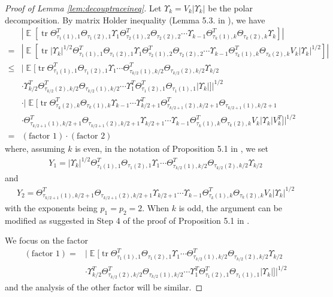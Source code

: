 \documentclass[11pt]{amsart}
\numberwithin{equation}{section}
\numberwithin{equation}{section}
\DeclareMathOperator{\E}{\mathbb{E}}
\DeclareMathOperator*{\tr}{tr}
\theoremstyle{remark}
\theoremstyle{definition}
\begin{document}
\begin{proof}[Proof of Lemma \ref{lem:decouptraceineq}]
Let $\Upsilon_k=V_k|\Upsilon_k|$ be the polar decomposition. By matrix Holder inequality (Lemma 5.3. in \cite{brailovskaya2022universality}), we have
\begin{align*}
    &|\E[
	\tr \Theta_{\tau_{1}(1),1}^T\Theta_{\tau_{1}(2),1}
	\Upsilon_1\Theta_{\tau_{2}(1),2}^T\Theta_{\tau_{2}(2),2}\cdots
	\Upsilon_{k-1}\Theta_{\tau_{k}(1),k}^T\Theta_{\tau_{k}(2),k}\Upsilon_k]|
 \\ = & |\E[
	\tr |\Upsilon_k|^{1/2}\Theta_{\tau_{1}(1),1}^T\Theta_{\tau_{1}(2),1}
	\Upsilon_1\Theta_{\tau_{2}(1),2}^T\Theta_{\tau_{2}(2),2}\cdots
	\Upsilon_{k-1}\Theta_{\tau_{k}(1),k}^T\Theta_{\tau_{k}(2),k}V_k|\Upsilon_k|^{1/2}]|
 \\ \le & |\E[
	\tr \Theta_{\tau_{1}(1),1}^T\Theta_{\tau_{1}(2),1}
	\Upsilon_1 \cdots \Theta_{\tau_{k/2}(1),k/2}^T\Theta_{\tau_{k/2}(2),k/2}
	\Upsilon_{k/2} 
 \\& \cdot \Upsilon_{k/2}^T \Theta_{\tau_{k/2}(2),k/2}^T\Theta_{\tau_{k/2}(1),k/2} \cdots \Upsilon_{1}^T \Theta_{\tau_{1}(2),1}^T\Theta_{\tau_{1}(1),1} |\Upsilon_k|]|^{1/2}
\\ &\cdot |\E[
	\tr  \Theta_{\tau_{k}(2),k}^T\Theta_{\tau_{k}(1),k}
	\Upsilon_{k-1} \cdots \Upsilon_{k/2+1}^T \Theta_{\tau_{k/2+1}(2),k/2+1}^T\Theta_{\tau_{k/2+1}(1),k/2+1}
 \\& \cdot
	\Theta_{\tau_{k/2+1}(1),k/2+1}^T\Theta_{\tau_{k/2+1}(2),k/2+1} \Upsilon_{k/2+1} \cdots \Upsilon_{k-1}  \Theta_{\tau_{k}(1),k}^T\Theta_{\tau_{k}(2),k} V_k |\Upsilon_k|V_k^T]|^{1/2}
  \\ =& (\text{factor 1}) \cdot (\text{factor 2})
\end{align*}
where, assuming $k$ is even, in the notation of Proposition 5.1 in \cite{brailovskaya2022universality}, we set
\begin{align*}Y_1=|\Upsilon_k|^{1/2}\Theta_{\tau_{1}(1),1}^T\Theta_{\tau_{1}(2),1}
	\Upsilon_1 \cdots \Theta_{\tau_{k/2}(1),k/2}^T\Theta_{\tau_{k/2}(2),k/2}
	\Upsilon_{k/2}\end{align*}
 and
\begin{align*}Y_2=\Theta_{\tau_{k/2+1}(1),k/2+1}^T\Theta_{\tau_{k/2+1}(2),k/2+1} \Upsilon_{k/2+1} \cdots \Upsilon_{k-1}  \Theta_{\tau_{k}(1),k}^T\Theta_{\tau_{k}(2),k} V_k |\Upsilon_k|^{1/2}\end{align*}
with the exponents being $p_1=p_2=2$. When $k$ is odd, the argument can be modified as suggested in Step 4 of the proof of Proposition 5.1 in \cite{brailovskaya2022universality}.

We focus on the factor
\begin{align*}
    (\text{factor 1})=&|\E[
	\tr \Theta_{\tau_{1}(1),1}^T\Theta_{\tau_{1}(2),1}
	\Upsilon_1 \cdots \Theta_{\tau_{k/2}(1),k/2}^T\Theta_{\tau_{k/2}(2),k/2}
	\Upsilon_{k/2} 
 \\& \cdot \Upsilon_{k/2}^T \Theta_{\tau_{k/2}(2),k/2}^T\Theta_{\tau_{k/2}(1),k/2} \cdots \Upsilon_{1}^T \Theta_{\tau_{1}(2),1}^T\Theta_{\tau_{1}(1),1} |\Upsilon_k|]|^{1/2}
\end{align*}
and the analysis of the other factor will be similar.



\end{proof}
\end{document}
